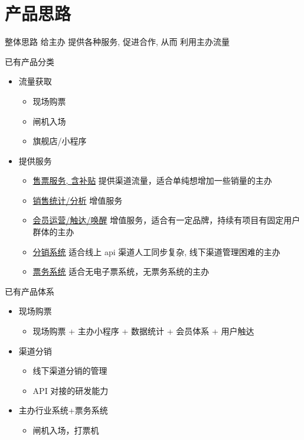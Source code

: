 \documentclass[presentation, bigger]{beamer}
\begin{document}
\section{产品思路}
\label{sec:org36e97a0}
\begin{frame}[label={sec:org8b8153f}]{整体思路}
给主办 \alert{提供各种服务}, 促进合作, 从而 \alert{利用主办流量}
\end{frame}
\begin{frame}[label={sec:orga4ccaae}]{已有产品分类}
\begin{itemize}
\item 流量获取
\begin{itemize}
\item 现场购票
\item 闸机入场
\item 旗舰店/小程序
\end{itemize}
\item 提供服务
\begin{itemize}
\item \uline{售票服务, 含补贴}  提供渠道流量，适合单纯想增加一些销量的主办
\item \uline{销售统计/分析} 增值服务
\item \uline{会员运营/触达/唤醒} 增值服务，适合有一定品牌，持续有项目有固定用户群体的主办
\item \uline{分销系统} 适合线上 api 渠道人工同步复杂, 线下渠道管理困难的主办
\item \uline{票务系统} 适合无电子票系统，无票务系统的主办
\end{itemize}
\end{itemize}
\end{frame}

\begin{frame}[label={sec:org08d7f21}]{已有产品体系}
\begin{itemize}
\item 现场购票
\begin{itemize}
\item 现场购票 + 主办小程序 + 数据统计 + 会员体系 + 用户触达
\end{itemize}
\item 渠道分销
\begin{itemize}
\item 线下渠道分销的管理
\item API 对接的研发能力
\end{itemize}
\item 主办行业系统+票务系统
\begin{itemize}
\item 闸机入场，打票机
\end{itemize}
\end{itemize}
\end{frame}
\end{document}
